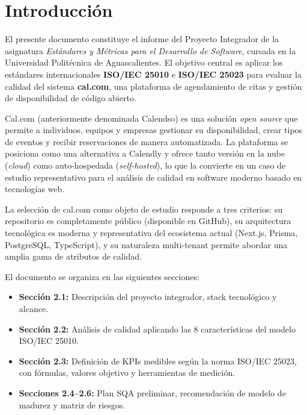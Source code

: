 \documentclass[12pt, a4paper]{article}
\begin{document}
\tableofcontents
\newpage

\section{Introducción}

El presente documento constituye el informe del Proyecto Integrador de la asignatura
\textit{Estándares y Métricas para el Desarrollo de Software}, cursada en la Universidad
Politécnica de Aguascalientes. El objetivo central es aplicar los estándares
internacionales \textbf{ISO/IEC 25010} e \textbf{ISO/IEC 25023} para evaluar la calidad
del sistema \textbf{cal.com}, una plataforma de agendamiento de citas y gestión de
disponibilidad de código abierto.

Cal.com (anteriormente denominada Calendso) es una solución \textit{open source} que
permite a individuos, equipos y empresas gestionar su disponibilidad, crear tipos de
eventos y recibir reservaciones de manera automatizada. La plataforma se posiciona como
una alternativa a Calendly y ofrece tanto versión en la nube (\textit{cloud}) como
auto-hospedada (\textit{self-hosted}), lo que la convierte en un caso de estudio
representativo para el análisis de calidad en software moderno basado en tecnologías web.

La selección de cal.com como objeto de estudio responde a tres criterios: su repositorio
es completamente público (disponible en GitHub), su arquitectura tecnológica es moderna y
representativa del ecosistema actual (Next.js, Prisma, PostgreSQL, TypeScript), y su
naturaleza multi-tenant permite abordar una amplia gama de atributos de calidad.

El documento se organiza en las siguientes secciones:

\begin{itemize}
    \item \textbf{Sección 2.1:} Descripción del proyecto integrador, stack tecnológico y alcance.
    \item \textbf{Sección 2.2:} Análisis de calidad aplicando las 8 características del modelo ISO/IEC 25010.
    \item \textbf{Sección 2.3:} Definición de KPIs medibles según la norma ISO/IEC 25023, con fórmulas, valores objetivo y herramientas de medición.
    \item \textbf{Secciones 2.4--2.6:} Plan SQA preliminar, recomendación de modelo de madurez y matriz de riesgos.
\end{itemize}
\end{document}
